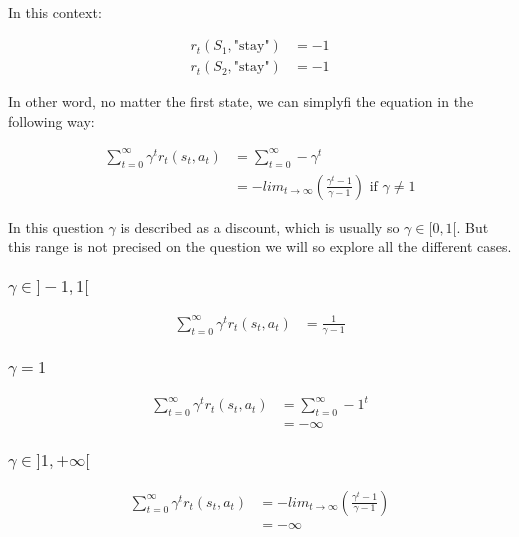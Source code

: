
\paragraph{}
In this context:

\begin{align*}
    r_t(S_1, \text{"stay"}) &= -1\\
    r_t(S_2, \text{"stay"}) &= -1
\end{align*}

In other word, no matter the first state, we can simplyfi the equation in the following way:

\begin{align*}
    \sum^\infty_{t=0} \gamma^t r_t(s_t, a_t) &= \sum^\infty_{t=0} - \gamma^t\\
    &= - lim_{t \rightarrow \infty} \left( \frac{\gamma^t - 1}{\gamma - 1} \right) \text{ if } \gamma \neq 1
\end{align*}

In this question $\gamma$ is described as a discount, which is usually so $\gamma \in [0, 1[$.
But this range is not precised on the question we will so explore all the different cases.

\subsubsection{$\gamma \in ]-1, 1[$}

\begin{align*}
    \sum^\infty_{t=0} \gamma^t r_t(s_t, a_t) &= \frac{1}{\gamma - 1}
\end{align*}

\subsubsection{$\gamma = 1$}

\begin{align*}
    \sum^\infty_{t=0} \gamma^t r_t(s_t, a_t) &= \sum^\infty_{t=0} - 1^t\\
    &= - \infty
\end{align*}

\subsubsection{$\gamma \in ]1, +\infty[ $}

\begin{align*}
    \sum^\infty_{t=0} \gamma^t r_t(s_t, a_t)
    &= -lim_{t \rightarrow \infty} \left( \frac{\gamma^t - 1}{\gamma - 1} \right)\\
    &= - \infty
\end{align*}

